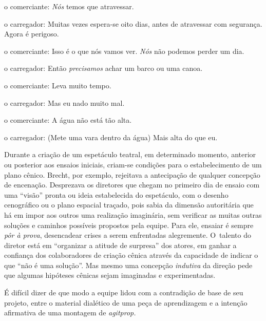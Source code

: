 {\sc o comerciante}: {\it Nós} temos que atravessar.

{\sc o carregador}: Muitas vezes espera-se oito dias, antes de atravessar com
segurança. Agora é perigoso.

{\sc o comerciante}: Isso é o que nós vamos ver. {\it Nós} não podemos perder
um dia.

{\sc o carregador}: Então {\it precisamos} achar um barco ou uma canoa.

{\sc o comerciante}: Leva muito tempo.

{\sc o carregador}: Mas eu nado muito mal.

{\sc o comerciante}: A água não está tão alta.

{\sc o carregador}: (Mete uma vara dentro da água) Mais alta do que eu.

\stopblockquote


\subject{Concepção em processo: a sala como tribuna}

Durante a criação de um espetáculo teatral, em determinado momento,
anterior ou posterior aos ensaios iniciais, criam-se condições para o
estabelecimento de um plano cênico. Brecht, por exemplo, rejeitava a
antecipação de qualquer concepção de encenação. Desprezava os
diretores
que chegam no primeiro dia de ensaio com uma “visão” pronta ou ideia
estabelecida do espetáculo, com o desenho cenográfico ou o plano
espacial traçado, pois sabia da dimensão autoritária que há em impor aos
outros uma realização imaginária, sem verificar as muitas outras
soluções e caminhos possíveis propostos pela equipe. Para ele, ensaiar é
sempre {\it pôr à prova}, desencadear crises a serem enfrentadas
alegremente. O~talento do diretor está em “organizar a atitude de
surpresa” dos atores, em ganhar a confiança dos colaboradores de criação
cênica através da capacidade de indicar o que “não é uma solução”. Mas
mesmo uma concepção {\it indutiva} da direção pede que algumas hipóteses
cênicas sejam imaginadas e experimentadas.

É difícil dizer de que modo a equipe lidou com a contradição de base de
seu projeto, entre o material dialético de uma peça de
aprendizagem e a intenção afirmativa de uma montagem de {\it agitprop.}

